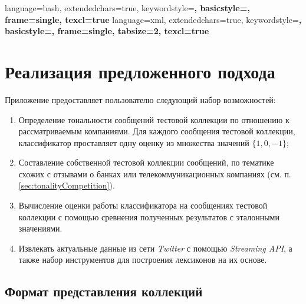 {
    language=bash,
    extendedchars=true,
    keywordstyle=\bfseries,
    basicstyle=\footnotesize,
    frame=single,
    texcl=true
}
{
    language=xml,
    extendedchars=true,
    keywordstyle=\bfseries,
    basicstyle=\footnotesize,
    frame=single,
    tabsize=2,
    texcl=true
}

\newpage
\section{Реализация предложенного подхода}
    Приложение предоставляет пользователю следующий набор возможностей:
    \begin{enumerate}
        \item Определение тональности сообщений тестовой коллекции по отношению к
        рассматриваемым компаниями. Для каждого сообщения тестовой коллекции,
        классификатор проставляет одну оценку из множества значений $\{1, 0, -1\}$;
        \item Составление собственной тестовой коллекции сообщений, по тематике
        схожих с отзывами о банках или телекоммуникационных компаниях
        (см. п. \ref{sec:tonalityCompetition}).
        \item Вычисление оценки работы классификатора на сообщениях тестовой
        коллекции с помощью сревнения полученных результатов с эталонными значениями.
        \item Извлекать актуальные данные из сети {\it Twitter} с помощью
        {\it Streaming API}, а также набор инструментов для построения лексиконов
        на их основе.
    \end{enumerate}

    \subsection{Формат представления коллекций}

